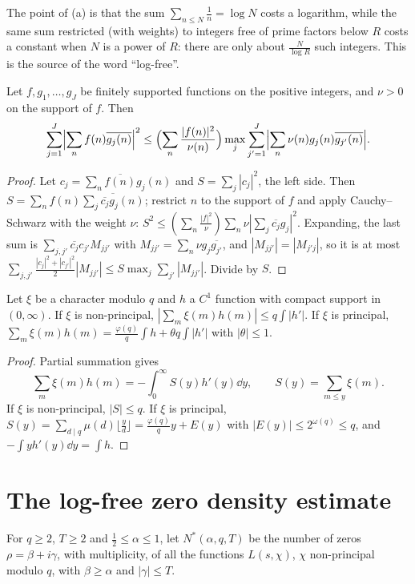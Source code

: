 The point of (a) is that the sum $\sum_{n\le N}\frac1n=\log N$ costs a logarithm, while the same sum restricted (with weights) to integers free of prime factors below $R$ costs a constant when $N$ is a power of $R$: there are only about $\frac N{\log R}$ such integers. This is the source of the word ``log-free''.

\begin{lemma}[duality]\label{lem:duality}
Let $f,g_1,\dots,g_J$ be finitely supported functions on the positive integers, and $\nu>0$ on the support of $f$. Then
\[
\sum_{j=1}^J\Bigl|\sum_nf(n)\overline{g_j(n)}\Bigr|^2\le\Bigl(\sum_n\frac{|f(n)|^2}{\nu(n)}\Bigr)\max_j\sum_{j'=1}^J\Bigl|\sum_n\nu(n)g_j(n)\overline{g_{j'}(n)}\Bigr|.
\]
\end{lemma}
\begin{proof}
Let $c_j=\sum_n\overline{f(n)}g_j(n)$ and $S=\sum_j|c_j|^2$, the left side. Then $S=\sum_nf(n)\overline{\sum_j\overline{c_j}g_j(n)}$; restrict $n$ to the support of $f$ and apply Cauchy--Schwarz with the weight $\nu$: $S^2\le(\sum_n\frac{|f|^2}\nu)\sum_n\nu|\sum_j\overline{c_j}g_j|^2$. Expanding, the last sum is $\sum_{j,j'}\overline{c_j}c_{j'}M_{jj'}$ with $M_{jj'}=\sum_n\nu g_j\overline{g_{j'}}$, and $|M_{jj'}|=|M_{j'j}|$, so it is at most $\sum_{j,j'}\frac{|c_j|^2+|c_{j'}|^2}2|M_{jj'}|\le S\max_j\sum_{j'}|M_{jj'}|$. Divide by $S$.
\end{proof}

\begin{lemma}\label{lem:smoothchar}
Let $\xi$ be a character modulo $q$ and $h$ a $C^1$ function with compact support in $(0,\infty)$. If $\xi$ is non-principal, $|\sum_m\xi(m)h(m)|\le q\int|h'|$. If $\xi$ is principal, $\sum_m\xi(m)h(m)=\frac{\varphi(q)}q\int h+\theta q\int|h'|$ with $|\theta|\le1$.
\end{lemma}
\begin{proof}
Partial summation gives
\[
\sum_m\xi(m)h(m)=-\int_0^\infty S(y)h'(y)\dd y,\qquad S(y)=\sum_{m\le y}\xi(m).
\]
 If $\xi$ is non-principal, $|S|\le q$. If $\xi$ is principal, $S(y)=\sum_{d\mid q}\mu(d)\lfloor\frac yd\rfloor=\frac{\varphi(q)}qy+E(y)$ with $|E(y)|\le2^{\omega(q)}\le q$, and $-\int yh'(y)\dd y=\int h$.
\end{proof}

\section{The log-free zero density estimate}

For $q\ge2$, $T\ge2$ and $\frac12\le\alpha\le1$, let $N^*(\alpha,q,T)$ be the number of zeros $\rho=\beta+i\gamma$, with multiplicity, of all the functions $L(s,\chi)$, $\chi$ non-principal modulo $q$, with $\beta\ge\alpha$ and $|\gamma|\le T$.

